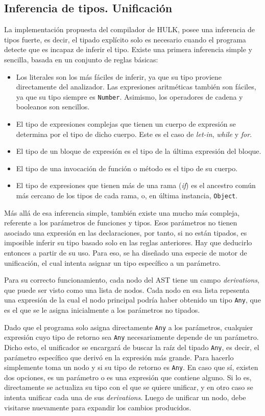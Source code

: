 \documentclass{llncs}
\begin{document}
\subsection{Inferencia de tipos. Unificación}

La implementación propuesta del compilador de HULK, posee una inferencia de tipos fuerte, es decir, el tipado explícito solo es necesario cuando el programa detecte que es incapaz de inferir el tipo. Existe una primera inferencia simple y sencilla, basada en un conjunto de reglas básicas: 
\begin{itemize}
    \item Los literales son los más fáciles de inferir, ya que su tipo proviene directamente del analizador. Las expresiones aritméticas también son fáciles, ya que su tipo siempre es \texttt{Number}. Asimismo, los operadores de cadena y booleanos son sencillos.
    \item El tipo de expresiones complejas que tienen un cuerpo de expresión se determina por el tipo de dicho cuerpo. Este es el caso de \textit{let-in}, \textit{while} y \textit{for}.
    \item El tipo de un bloque de expresión es el tipo de la última expresión del bloque.
    \item El tipo de una invocación de función o método es el tipo de su cuerpo.
    \item El tipo de expresiones que tienen más de una rama (\textit{if}) es el ancestro común más cercano de los tipos de cada rama, o, en última instancia, \texttt{Object}.
\end{itemize}

Más allá de esa inferencia simple, también existe una mucho más compleja, referente a los parámetros de funciones y tipos. Esos parámetros no tienen asociado una expresión en las declaraciones, por tanto, si no están tipados, es imposible inferir su tipo basado solo en las reglas anteriores. Hay que deducirlo entonces 
a partir de su uso. Para eso, se ha diseñado una especie de motor de unificación, el cual intenta asignar un tipo específico a un parámetro. 

Para su correcto funcionamiento, cada nodo del AST tiene un campo \textit{derivations}, que puede ser visto como una lista de nodos. Cada nodo en esa lista repesenta una expresión de la cual el nodo principal podría haber obtenido un tipo \texttt{Any}, que es el que se le asigna inicialmente a los parámetros no tipados. 

Dado que el programa solo asigna directamente \texttt{Any} a los parámetros, cualquier expresión cuyo tipo de retorno sea \texttt{Any} necesariamente depende de un parámetro. Dicho esto, el unificador se encargará de buscar la raíz del tipado \texttt{Any}, es decir, el parámetro específico que derivó en la expresión más grande.
Para hacerlo simplemente toma un nodo y si su tipo de retorno es \texttt{Any}. En caso que sí, existen dos opciones, es un parámetro o es una expresión que contiene alguno. Si lo es, directamente se actualiza su tipo con el que se quiere unificar, y en otro caso se intenta unificar cada una de sus \textit{derivations}. Luego de unificar 
un nodo, debe visitarse nuevamente para expandir los cambios producidos.
\end{document}
